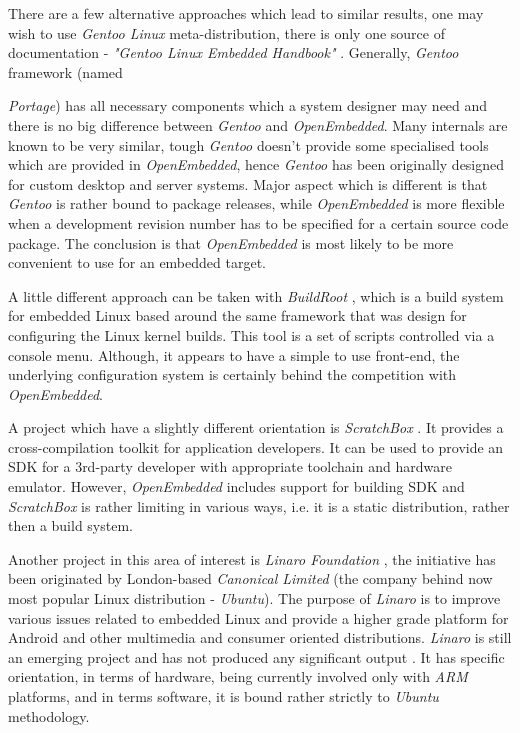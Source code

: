   There are a few alternative approaches which lead to similar results,
 one may wish to use \emph{Gentoo Linux} meta-distribution, there
 is only one source of documentation - \emph{"Gentoo Linux Embedded
 Handbook"} \cite{links:gentoo:embedded}. Generally, \emph{Gentoo}
 framework (named {\emph{Portage}) has all necessary components
 which a system designer may need and there is no big difference
 between \emph{Gentoo} and \emph{OpenEmbedded}. Many internals
 are known to be very similar, tough \emph{Gentoo} doesn't provide
 some specialised tools which are provided in \emph{OpenEmbedded},
 hence \emph{Gentoo} has been originally designed for custom
 desktop and server systems. Major aspect which is different is
 that \emph{Gentoo} is rather bound to package releases, while
 \emph{OpenEmbedded} is more flexible when a development revision
 number has to be specified for a certain source code package.
 The conclusion is that \emph{OpenEmbedded} is most likely to be
 more convenient to use for an embedded target.
 
  A little different approach can be taken with \emph{BuildRoot}
 \cite{links:buildroot:homepage}, which is a build system for
 embedded Linux based around the same framework that was design
 for configuring the Linux kernel builds. This tool is a set of
 scripts controlled via a console menu. Although, it appears to
 have a simple to use front-end, the underlying configuration
 system is certainly behind the competition with \emph{OpenEmbedded}.

  A project which have a slightly different orientation is
 \emph{ScratchBox} \cite{links:sbox:homepage}. It provides
 a cross-compilation toolkit for application developers.
 It can be used to provide an SDK for a 3rd-party developer
 with appropriate toolchain and hardware emulator. However,
 \emph{OpenEmbedded} includes support for building SDK and
 \emph{ScratchBox} is rather limiting in various ways, i.e.
 it is a static distribution, rather then a build system.
 
  Another project in this area of interest is \emph{Linaro Foundation}
 \cite{links:linaro:about}, the initiative has been originated by
 London-based \emph{Canonical Limited} (the company behind now most
 popular Linux distribution - \emph{Ubuntu}).
 The purpose of \emph{Linaro} is to improve various issues related to
 embedded Linux and provide a higher grade platform for Android and
 other multimedia and consumer oriented distributions. \emph{Linaro} is
 still an emerging project and has not produced any significant output
 \cite{links:linaro:homepage}. It has specific orientation, in terms of
 hardware, being currently involved only with \emph{ARM} platforms,
 and in terms software, it is bound rather strictly to \emph{Ubuntu}
 methodology.

}
